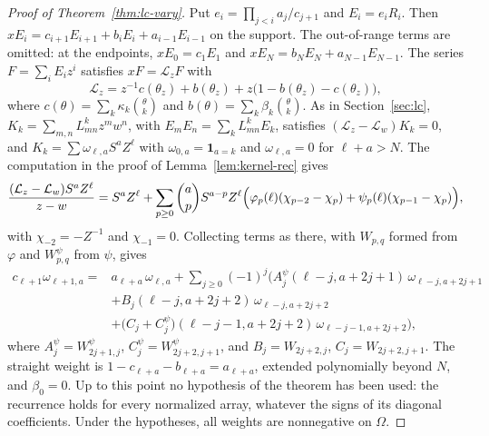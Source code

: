 \begin{proof}[Proof of Theorem~\ref{thm:lc-vary}]
Put $e_i=\prod_{j<i}a_j/c_{j+1}$ and $E_i=e_iR_i$. Then $xE_i=c_{i+1}E_{i+1}+b_iE_i+a_{i-1}E_{i-1}$ on the support. The out-of-range terms are omitted: at the endpoints, $xE_0=c_1E_1$ and $xE_N=b_NE_N+a_{N-1}E_{N-1}$. The series $F=\sum_iE_iz^i$ satisfies $xF=\mathcal L_zF$ with
\[
\mathcal L_z=z^{-1}c(\theta_z)+b(\theta_z)+z\bigl(1-b(\theta_z)-c(\theta_z)\bigr),
\]
where $c(\theta)=\sum_k\kappa_k\binom\theta k$ and $b(\theta)=\sum_k\beta_k\binom\theta k$. As in Section~\ref{sec:lc}, $K_k=\sum_{m,n}L_{mn}^kz^mw^n$, with $E_mE_n=\sum_kL_{mn}^kE_k$, satisfies $(\mathcal L_z-\mathcal L_w)K_k=0$, and $K_k=\sum\omega_{\ell,a}S^aZ^\ell$ with $\omega_{0,a}=\mathbf1_{a=k}$ and $\omega_{\ell,a}=0$ for $\ell+a>N$. The computation in the proof of Lemma~\ref{lem:kernel-rec} gives
\[
\frac{(\mathcal L_z-\mathcal L_w)S^aZ^\ell}{z-w}=S^aZ^\ell+\sum_{p\geq0}\binom apS^{a-p}Z^\ell\Bigl(\varphi_p(\ell)(\chi_{p-2}-\chi_p)+\psi_p(\ell)(\chi_{p-1}-\chi_p)\Bigr),
\]
with $\chi_{-2}=-Z^{-1}$ and $\chi_{-1}=0$. Collecting terms as there, with $W_{p,q}$ formed from $\varphi$ and $W^\psi_{p,q}$ from $\psi$, gives
\[
\begin{aligned}
c_{\ell+1}\omega_{\ell+1,a}={}&a_{\ell+a}\,\omega_{\ell,a}+\sum_{j\geq0}(-1)^j\Big(A^\psi_j(\ell-j,a+2j+1)\,\omega_{\ell-j,a+2j+1}\\
&+B_j(\ell-j,a+2j+2)\,\omega_{\ell-j,a+2j+2}\\
&+\bigl(C_j+C^\psi_j\bigr)(\ell-j-1,a+2j+2)\,\omega_{\ell-j-1,a+2j+2}\Big),
\end{aligned}
\]
where $A^\psi_j=W^\psi_{2j+1,j}$, $C^\psi_j=W^\psi_{2j+2,j+1}$, and $B_j=W_{2j+2,j}$, $C_j=W_{2j+2,j+1}$. The straight weight is $1-c_{\ell+a}-b_{\ell+a}=a_{\ell+a}$, extended polynomially beyond $N$, and $\beta_0=0$. Up to this point no hypothesis of the theorem has been used: the recurrence holds for every normalized array, whatever the signs of its diagonal coefficients. Under the hypotheses, all weights are nonnegative on $\Omega$.


\end{proof}

